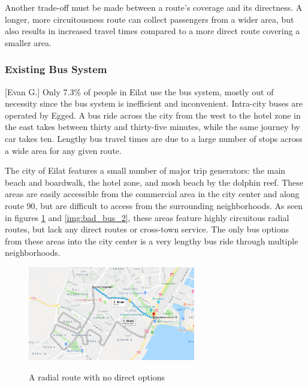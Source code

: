 \documentclass[12pt]{article}                               %
\begin{document}
Another trade-off must be made between a route's coverage and its directness. A longer, more circuitousness route can collect passengers from a wider area, but also results in increased travel times compared to a more direct route covering a smaller area.

\subsubsection{Existing Bus System}[Evan G.]
Only 7.3\% of people in Eilat use the bus system, mostly out of necessity since the bus system is inefficient and inconvenient. Intra-city buses are operated by Egged. A bus ride across the city from the west to the hotel zone in the east takes between thirty and thirty-five minutes, while the same journey by car takes ten. Lengthy bus travel times are due to a large number of stops across a wide area for any given route.

The city of Eilat features a small number of major trip generators: the main beach and boardwalk, the hotel zone, and mosh beach by the dolphin reef. These areas are easily accessible from the commercial area in the city center and along route 90, but are difficult to access from the surrounding neighborhoods. As seen in figures \ref{img:bad_bus_1} and \ref{img:bad_bus_2}, these areas feature highly circuitous radial routes, but lack any direct routes or cross-town service. The only bus options from these areas into the city center is a very lengthy bus ride through multiple neighborhoods.

\begin{figure}[H]
    \centering
    \href{https://www.google.com/maps/dir/29.5578131,34.9388748/29.5512465,34.9536416/@29.5539541,34.9429944,15.12z/data=!4m2!4m1!3e3}{\includegraphics[width=0.65\textwidth]{images/bad_bus_1.png}}
    \caption{A radial route with no direct options}
    \label{img:bad_bus_1}
\end{figure}
\end{document}
